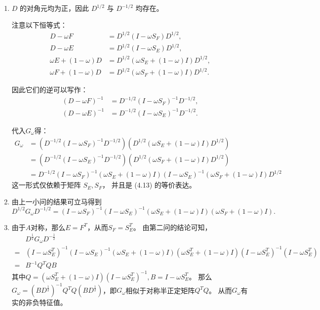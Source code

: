 \documentclass{ctexart}
\begin{document}
\begin{solution}
\begin{enumerate}
  \item  \( D \) 的对角元均为正，因此 \( D^{1/2} \) 与 \( D^{-1/2} \) 均存在。

注意以下恒等式：
\[
\begin{aligned}
D - \omega F &= D^{1/2} (I - \omega S_F) D^{1/2}, \\
D - \omega E &= D^{1/2} (I - \omega S_E) D^{1/2}, \\
\omega E + (1 - \omega) D &= D^{1/2} (\omega S_E + (1 - \omega) I) D^{1/2}, \\
\omega F + (1 - \omega) D &= D^{1/2} (\omega S_F + (1 - \omega) I) D^{1/2}.
\end{aligned}
\]

因此它们的逆可以写作：
\[
\begin{aligned}
(D - \omega F)^{-1} &= D^{-1/2} (I - \omega S_F)^{-1} D^{-1/2}, \\
(D - \omega E)^{-1} &= D^{-1/2} (I - \omega S_E)^{-1} D^{-1/2}.
\end{aligned}
\]

代入\(G_{\omega } \)得：
\[
\begin{aligned}
G_{\omega}&= 
  (D^{-1/2} (I - \omega S_F)^{-1} D^{-1/2})(D^{1/2} (\omega S_E + (1 - \omega) I) D^{1/2})\\
  &=(D^{-1/2} (I - \omega S_E)^{-1} D^{-1/2})(D^{1/2} (\omega S_F + (1 - \omega) I) D^{1/2})\\
  &=D^{-1/2}(I - \omega S_F)^{-1}(\omega S_E + (1 - \omega) I)(I - \omega S_E)^{-1}(\omega S_F + (1 - \omega) I)D^{1/2}
\end{aligned}
\]
这一形式仅依赖于矩阵 \( S_E, S_F \)，
并且是 (4.13) 的等价表达。
\item  由上一小问的结果可立马得到 \[
    D^{1/2} G_{\omega} D^{-1/2}
    = (I - \omega S_F)^{-1} (I - \omega S_E)^{-1}
      (\omega S_E + (1 - \omega) I)
      (\omega S_F + (1 - \omega) I).
  \]
\item 由于\(A \)对称，那么\(E=F^T \)，从而\(S_F=S_E^T \)。
  由第二问的结论可知，\[
\begin{aligned}
  &D^{\frac{1}{2}}G_{\omega}D^{-\frac{1}{2}}\\
  =& (I - \omega S_E^T)^{-1} (I - \omega S_E)^{-1}(\omega S_E + (1 - \omega) I)(\omega S_E^T + (1 - \omega) I)(I-\omega S_E^T)^{-1}(I-\omega S_E^T)\\ 
  =& B^{-1}Q^TQB
\end{aligned}
    \]
    其中\(Q=(\omega S_E^T + (1 - \omega) I)(I-\omega S_E^T)^{-1}, B=I-\omega S_E^T \)。
那么\(G_{\omega}=(BD^{\frac{1}{2}})^{-1}Q^TQ (BD^{\frac{1}{2}})\)，即\(G_{\omega} \)相似于对称半正定矩阵\(Q^TQ \)。
从而\(G_{\omega} \)有实的非负特征值。
\end{enumerate}
\end{solution}
 
\end{document}
